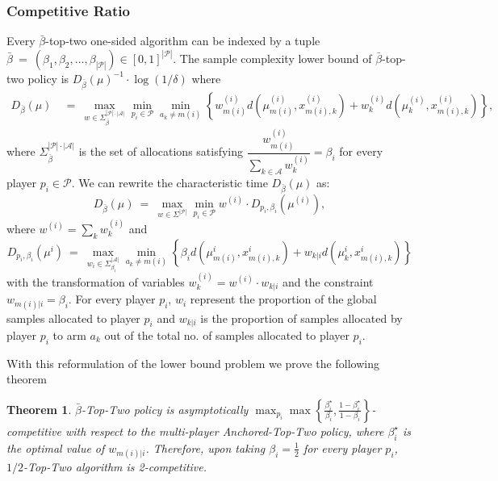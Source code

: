 \documentclass{article}
\newtheorem{theorem}{Theorem}
\begin{document}
\subsubsection{Competitive Ratio}
Every $\bar{\beta}$-top-two one-sided algorithm can be indexed by a tuple $\bar{\beta}~=~(\beta_1,\beta_2,\hdots,\beta_{|\mathcal{P}|})\in[0,1]^{|\mathcal{P}|}$. The sample complexity lower bound of $\bar{\beta}$-top-two policy is $D_{\bar{\beta}}(\mu)^{-1}\cdot \log(1/\delta)$ where
\begin{align*}
    D_{\bar{\beta}}(\mu)~&=~\max_{w\in \Sigma^{|\mathcal{P}|\cdot |\mathcal{A}|}_{\bar{\beta}}}\min_{p_i\in\mathcal{P}}\min_{a_k\neq m(i)}\left\{w^{(i)}_{m(i)} d(\mu^{(i)}_{m(i)},x^{(i)}_{m(i),k})+w^{(i)}_k d(\mu^{(i)}_k,x^{(i)}_{m(i),k})\right\},
\end{align*}
where $\Sigma^{|\mathcal{P}|\cdot |\mathcal{A}|}_{\bar{\beta}}$ is the set of allocations satisfying $\dfrac{w^{(i)}_{m(i)}}{\sum_{k\in \mathcal{A}} w_{k}^{(i)}}=\beta_i$ for every player $p_i\in\mathcal{P}$. We can rewrite the characteristic time $D_{\bar{\beta}}(\mu)$ as: 
\[D_{\bar{\beta}}(\mu)~=~\max_{w\in\Sigma^{|\mathcal{P}|}}\min_{p_i\in\mathcal{P}}w^{(i)}\cdot D_{p_i,\beta_i}(\mu^{(i)}),\]
where $w^{(i)}=\sum_{k} w^{(i)}_k$ and
\[D_{p_i,\beta_i}(\mu^i)~=~\max_{w_i\in \Sigma^{|\mathcal{A}|}_{\beta_i}}\min_{a_k\neq m(i)}\left\{\beta_i d(\mu^i_{m(i)},x^i_{m(i),k})+w_{k|i} d(\mu^i_k,x^i_{m(i),k})\right\}\]
with the transformation of variables $w^{(i)}_k=w^{(i)}\cdot w_{k|i}$ and the constraint $w_{m(i)|i}=\beta_i$. For every player $p_i$, $w_i$ represent the proportion of the global samples allocated to player $p_i$ and $w_{k|i}$ is the proportion of samples allocated by player $p_i$ to arm $a_k$ out of the total no. of samples allocated to player $p_i$. 

With this reformulation of the lower bound problem we prove the following theorem 
\begin{theorem}\label{thm:cr_of_beta_top_two}
    $\bar{\beta}$-Top-Two policy is asymptotically $\max_{p_i}\max\left\{\frac{\beta_i^\star}{\beta_i},\frac{1-\beta_i^\star}{1-\beta_i}\right\}$-competitive with respect to the multi-player Anchored-Top-Two policy, where $\beta_i^\star$ is the optimal value of $w_{m(i)|i}$.   Therefore, upon taking $\beta_i=\frac{1}{2}$ for every player $p_i$, $1/2$-Top-Two algorithm is 2-competitive. 
\end{theorem}
\end{document}
